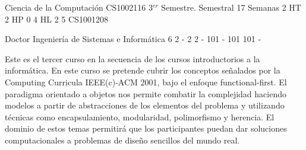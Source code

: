 \documentclass[a4paper,8pt]{article}
\begin{document}
\setNombreProfesor{}
\setGradoProfesorAbreviado{}
\sylabusHeader

\academicaTable
{Ciencia de la Computación} %
{CS1002116} %
{3$^{er}$ Semestre.} %
{Semestral} %
{17 Semanas} %
{2 HT} %
{2 HP} %
{0} %
{4 HL}  %
{2} %
{5} %
{CS1001208} %

\administrativaTable
{Doctor} %
{Ingeniería de Sistemas e Informática} %
{6} %
{2} %
{-} %
{2} %
{2} %
{-} %
{101} %
{-} %
{101} %
{101} %
{-} %


\begin{fundamentacion}
Este es el tercer curso en la secuencia de los cursos introductorios a la informática. En este curso se pretende cubrir los
conceptos señalados por la Computing Curricula IEEE(c)-ACM 2001, bajo el enfoque functional-first.
El paradigma orientado a objetos nos permite combatir la complejidad haciendo modelos a partir de abstracciones
de los elementos del problema y utilizando técnicas como encapsulamiento, modularidad, polimorfismo y herencia. El
dominio de estos temas permitirá que los participantes puedan dar soluciones computacionales a problemas de diseño
sencillos del mundo real.

\end{fundamentacion}

\begin{sumilla}
\item \SDFFundamentalProgrammingConcepts
\item \SDFAlgorithmsandDesign
\item \PLEventDrivenandReactiveProgramming
\item \ALBasicAnalysis
\item \ALFundamentalDataStructuresandAlgorithms
\item \PLBasicTypeSystems
\item \PLObjectOrientedProgramming
\item \DSGraphsandTrees
\item \SESoftwareDesign
\item \SERequirementsEngineering

\end{sumilla}
\end{document}
